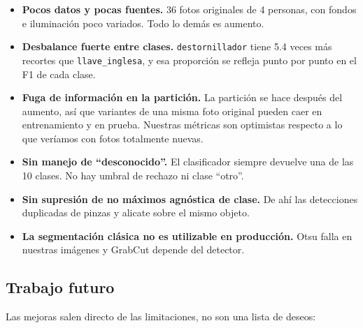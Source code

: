 \documentclass[11pt,a4paper]{article}
\newcommand{\clase}[1]{\texttt{#1}}
\begin{document}
\begin{itemize}
  \item \textbf{Pocos datos y pocas fuentes.} 36 fotos originales de 4 personas, con fondos e
        iluminación poco variados. Todo lo demás es aumento.
  \item \textbf{Desbalance fuerte entre clases.} \clase{destornillador} tiene 5.4 veces más
        recortes que \clase{llave\_inglesa}, y esa proporción se refleja punto por punto en el F1
        de cada clase.
  \item \textbf{Fuga de información en la partición.} La partición se hace después del aumento, así
        que variantes de una misma foto original pueden caer en entrenamiento y en prueba. Nuestras
        métricas son optimistas respecto a lo que veríamos con fotos totalmente nuevas.
  \item \textbf{Sin manejo de \enquote{desconocido}.} El clasificador siempre devuelve una de las
        10 clases. No hay umbral de rechazo ni clase \enquote{otro}.
  \item \textbf{Sin supresión de no máximos agnóstica de clase.} De ahí las detecciones duplicadas
        de pinzas y alicate sobre el mismo objeto.
  \item \textbf{La segmentación clásica no es utilizable en producción.} Otsu falla en nuestras
        imágenes y GrabCut depende del detector.
\end{itemize}

\subsection{Trabajo futuro}

Las mejoras salen directo de las limitaciones, no son una lista de deseos:
\end{document}
